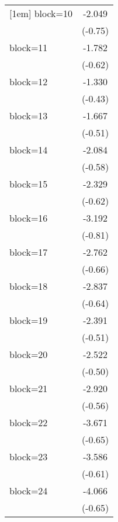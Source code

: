 {\begin{longtable}{l*{1}{c}}
[1em]
block=10            &      -2.049         \\
                    &     (-0.75)         \\
[1em]
block=11            &      -1.782         \\
                    &     (-0.62)         \\
[1em]
block=12            &      -1.330         \\
                    &     (-0.43)         \\
[1em]
block=13            &      -1.667         \\
                    &     (-0.51)         \\
[1em]
block=14            &      -2.084         \\
                    &     (-0.58)         \\
[1em]
block=15            &      -2.329         \\
                    &     (-0.62)         \\
[1em]
block=16            &      -3.192         \\
                    &     (-0.81)         \\
[1em]
block=17            &      -2.762         \\
                    &     (-0.66)         \\
[1em]
block=18            &      -2.837         \\
                    &     (-0.64)         \\
[1em]
block=19            &      -2.391         \\
                    &     (-0.51)         \\
[1em]
block=20            &      -2.522         \\
                    &     (-0.50)         \\
[1em]
block=21            &      -2.920         \\
                    &     (-0.56)         \\
[1em]
block=22            &      -3.671         \\
                    &     (-0.65)         \\
[1em]
block=23            &      -3.586         \\
                    &     (-0.61)         \\
[1em]
block=24            &      -4.066         \\
                    &     (-0.65)         \\

\end{longtable}}

